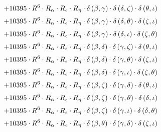 \begin{subequations}
\begin{gather}
 \\[0.2em] \notag 		 + 10395 \cdot R^{6} \cdot R_{\alpha{}} \cdot R_{\epsilon{}} \cdot R_{\eta{}} \cdot \delta{}\left(\beta{}, \gamma{}\right) \cdot \delta{}\left(\delta{}, \zeta{}\right) \cdot \delta{}\left(\theta{}, \iota{}\right) 
 \\[0.2em] \notag 		 + 10395 \cdot R^{6} \cdot R_{\alpha{}} \cdot R_{\epsilon{}} \cdot R_{\eta{}} \cdot \delta{}\left(\beta{}, \gamma{}\right) \cdot \delta{}\left(\delta{}, \theta{}\right) \cdot \delta{}\left(\zeta{}, \iota{}\right) 
 \\[0.2em] \notag 		 + 10395 \cdot R^{6} \cdot R_{\alpha{}} \cdot R_{\epsilon{}} \cdot R_{\eta{}} \cdot \delta{}\left(\beta{}, \gamma{}\right) \cdot \delta{}\left(\delta{}, \iota{}\right) \cdot \delta{}\left(\zeta{}, \theta{}\right) 
 \\[0.2em] \notag 		 + 10395 \cdot R^{6} \cdot R_{\alpha{}} \cdot R_{\epsilon{}} \cdot R_{\eta{}} \cdot \delta{}\left(\beta{}, \delta{}\right) \cdot \delta{}\left(\gamma{}, \zeta{}\right) \cdot \delta{}\left(\theta{}, \iota{}\right) 
 \\[0.2em] \notag 		 + 10395 \cdot R^{6} \cdot R_{\alpha{}} \cdot R_{\epsilon{}} \cdot R_{\eta{}} \cdot \delta{}\left(\beta{}, \delta{}\right) \cdot \delta{}\left(\gamma{}, \theta{}\right) \cdot \delta{}\left(\zeta{}, \iota{}\right) 
 \\[0.2em] \notag 		 + 10395 \cdot R^{6} \cdot R_{\alpha{}} \cdot R_{\epsilon{}} \cdot R_{\eta{}} \cdot \delta{}\left(\beta{}, \delta{}\right) \cdot \delta{}\left(\gamma{}, \iota{}\right) \cdot \delta{}\left(\zeta{}, \theta{}\right) 
 \\[0.2em] \notag 		 + 10395 \cdot R^{6} \cdot R_{\alpha{}} \cdot R_{\epsilon{}} \cdot R_{\eta{}} \cdot \delta{}\left(\beta{}, \zeta{}\right) \cdot \delta{}\left(\gamma{}, \delta{}\right) \cdot \delta{}\left(\theta{}, \iota{}\right) 
 \\[0.2em] \notag 		 + 10395 \cdot R^{6} \cdot R_{\alpha{}} \cdot R_{\epsilon{}} \cdot R_{\eta{}} \cdot \delta{}\left(\beta{}, \zeta{}\right) \cdot \delta{}\left(\gamma{}, \theta{}\right) \cdot \delta{}\left(\delta{}, \iota{}\right) 
 \\[0.2em] \notag 		 + 10395 \cdot R^{6} \cdot R_{\alpha{}} \cdot R_{\epsilon{}} \cdot R_{\eta{}} \cdot \delta{}\left(\beta{}, \zeta{}\right) \cdot \delta{}\left(\gamma{}, \iota{}\right) \cdot \delta{}\left(\delta{}, \theta{}\right) 
 \\[0.2em] \notag 		 + 10395 \cdot R^{6} \cdot R_{\alpha{}} \cdot R_{\epsilon{}} \cdot R_{\eta{}} \cdot \delta{}\left(\beta{}, \theta{}\right) \cdot \delta{}\left(\gamma{}, \delta{}\right) \cdot \delta{}\left(\zeta{}, \iota{}\right) 

\end{gather}
\end{subequations}
